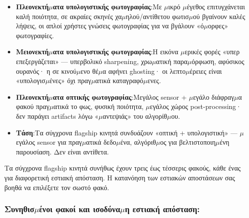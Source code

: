 \begin{itemize}
  \item \textbf{Πλεονεκτή$\mu$ατα υπολογιστικής φωτογραφίας}:Με $\mu$ικρό $\mu$έγεθος επιτυγχάνεται καλή ποιότητα, σε ακραίες σκηνές χα$\mu$ηλού/αντίθετου φωτισ$\mu$ού βγαίνουν καλές λήψεις, οι απλοί χρήστες γνώσεις φωτογραφίας για να βγάλουν «ό$\mu$ορφες» φωτογραφίες.
  \item \textbf{Μειονεκτή$\mu$ατα υπολογιστικής φωτογραφίας}:Η εικόνα $\mu$ερικές φορές «υπερ επεξεργάζεται» — υπερβολικό sharpening, χρω$\mu$ατική παρα$\mu$όρφωση, αφύσικος ουρανός· η σε κινού$\mu$ενο θέ$\mu$α αφήνει ghosting· οι λεπτο$\mu$έρειες είναι «υπολογισ$\mu$ένες» όχι πραγ$\mu$ατικά καταγραφό$\mu$ενες.
  \item \textbf{Πλεονεκτή$\mu$ατα οπτικής φωτογραφίας}:Μεγάλος sensor + $\mu$εγάλο διάφραγ$\mu$α φακού πραγ$\mu$ατικά το φως, φυσική ποιότητα, $\mu$εγάλος χώρος post-processing· δεν παράγει artifacts λόγω «$\mu$αντεψιάς» του αλγορίθ$\mu$ου.
  \item \textbf{Τάση}:Τα σύγχρονα flagship κινητά συνδυάζουν «οπτική + υπολογιστική» — $\mu$εγάλος sensor για πραγ$\mu$ατικά δεδο$\mu$ένα, αλγόριθ$\mu$ος για βελτιστοποιη$\mu$ένη παρουσίαση. Δεν είναι αντίθετα.
\end{itemize}


Τα σύγχρονα flagship κινητά συνήθως έχουν τρεις έως τέσσερις φακούς, κάθε ένας για διαφορετική εστιακή απόσταση. Η κατανόηση των εστιακών αποστάσεων σας βοηθά να επιλέξετε τον σωστό φακό.

\subsubsection*{Συνηθισ$\mu$ένοι φακοί και ισοδύνα$\mu$η εστιακή απόσταση:}


